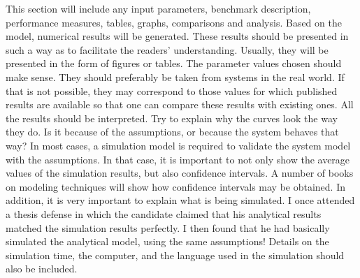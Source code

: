 \documentclass[conference,letterpaper]{IEEEtran}
\begin{document}
This section will include any input parameters, benchmark description, performance measures, tables, graphs, comparisons and analysis. Based on the model, numerical results will be generated. These results should be presented in such a way as to facilitate the readers' understanding. Usually, they will be presented in the form of figures or tables. The parameter values chosen should make sense. They should preferably be taken from systems in the real world. If that is not possible, they may correspond to those values for which published results are available so that one can compare these results with existing ones. All the results should be interpreted. Try to explain why the curves look the way they do. Is it because of the assumptions, or because the system behaves that way? In most cases, a simulation model is required to validate the system model with the assumptions. In that case, it is important to not only show the average values of the simulation results, but also confidence intervals. A number of books on modeling techniques will show how confidence intervals may be obtained. In addition, it is very important to explain what is being simulated. I once attended a thesis defense in which the candidate claimed that his analytical results matched the simulation results perfectly. I then found that he had basically simulated the analytical model, using the same assumptions! Details on the simulation time, the computer, and the language used in the simulation should also be included.



%


%
\end{document}
